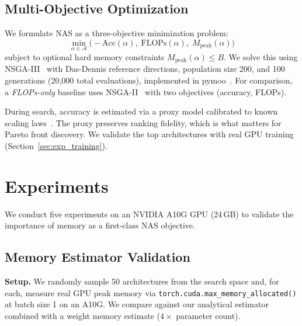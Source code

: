 \documentclass[10pt,twocolumn,letterpaper]{article}
\begin{document}
\subsection{Multi-Objective Optimization}
\label{sec:optimization}

We formulate NAS as a three-objective minimization problem:
\begin{equation}
\min_{\alpha \in \mathcal{A}} \Big( -\text{Acc}(\alpha), \; \text{FLOPs}(\alpha), \; M_{\text{peak}}(\alpha) \Big)
\end{equation}
subject to optional hard memory constraints $M_{\text{peak}}(\alpha) \leq B$. We solve this using NSGA-III~\cite{deb2014nsga3} with Das-Dennis reference directions, population size 200, and 100 generations (20,000 total evaluations), implemented in pymoo~\cite{blank2020pymoo}. For comparison, a \emph{FLOPs-only} baseline uses NSGA-II~\cite{deb2002nsga2} with two objectives (accuracy, FLOPs).

During search, accuracy is estimated via a proxy model calibrated to known scaling laws~\cite{tan2019efficientnet, canziani2017analysis}. The proxy preserves ranking fidelity, which is what matters for Pareto front discovery. We validate the top architectures with real GPU training (Section~\ref{sec:exp_training}).

\section{Experiments}
\label{sec:experiments}

We conduct five experiments on an NVIDIA A10G GPU (24\,GB) to validate the importance of memory as a first-class NAS objective.

\subsection{Memory Estimator Validation}
\label{sec:exp_validation}

\textbf{Setup.} We randomly sample 50 architectures from the search space and, for each, measure real GPU peak memory via \texttt{torch.cuda.max\_memory\_allocated()} at batch size 1 on an A10G. We compare against our analytical estimator combined with a weight memory estimate ($4 \times$ parameter count).
\end{document}
